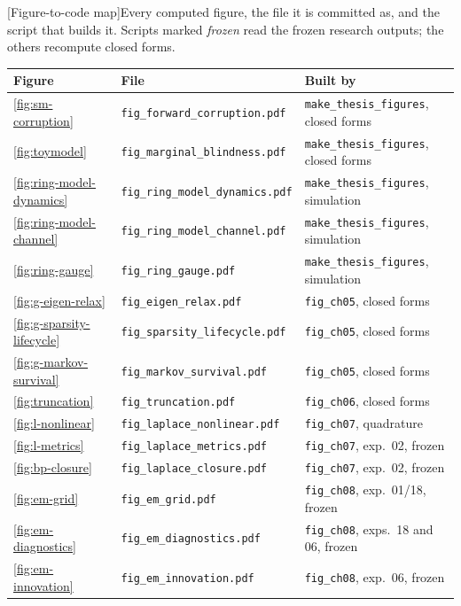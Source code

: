 \begin{center}
\begin{minipage}{\linewidth}\small\centering
{}[Figure-to-code map]{Every computed figure, the file it is
committed as, and the script that builds it. Scripts marked \emph{frozen}
read the frozen research outputs; the others recompute closed forms.}
\label{tab:figure-map}
\begin{tabular}{@{}lll@{}}
\toprule
Figure & File & Built by \\
\midrule
\ref{fig:sm-corruption} & \texttt{fig\_forward\_corruption.pdf} & \texttt{make\_thesis\_figures}, closed forms \\
\ref{fig:toymodel} & \texttt{fig\_marginal\_blindness.pdf} & \texttt{make\_thesis\_figures}, closed forms \\
\ref{fig:ring-model-dynamics} & \texttt{fig\_ring\_model\_dynamics.pdf} & \texttt{make\_thesis\_figures}, simulation \\
\ref{fig:ring-model-channel} & \texttt{fig\_ring\_model\_channel.pdf} & \texttt{make\_thesis\_figures}, simulation \\
\ref{fig:ring-gauge} & \texttt{fig\_ring\_gauge.pdf} & \texttt{make\_thesis\_figures}, simulation \\
\ref{fig:g-eigen-relax} & \texttt{fig\_eigen\_relax.pdf} & \texttt{fig\_ch05}, closed forms \\
\ref{fig:g-sparsity-lifecycle} & \texttt{fig\_sparsity\_lifecycle.pdf} & \texttt{fig\_ch05}, closed forms \\
\ref{fig:g-markov-survival} & \texttt{fig\_markov\_survival.pdf} & \texttt{fig\_ch05}, closed forms \\
\ref{fig:truncation} & \texttt{fig\_truncation.pdf} & \texttt{fig\_ch06}, closed forms \\
\ref{fig:l-nonlinear} & \texttt{fig\_laplace\_nonlinear.pdf} & \texttt{fig\_ch07}, quadrature \\
\ref{fig:l-metrics} & \texttt{fig\_laplace\_metrics.pdf} & \texttt{fig\_ch07}, exp.~02, frozen \\
\ref{fig:bp-closure} & \texttt{fig\_laplace\_closure.pdf} & \texttt{fig\_ch07}, exp.~02, frozen \\
\ref{fig:em-grid} & \texttt{fig\_em\_grid.pdf} & \texttt{fig\_ch08}, exp.~01/18, frozen \\
\ref{fig:em-diagnostics} & \texttt{fig\_em\_diagnostics.pdf} & \texttt{fig\_ch08}, exps.~18 and 06, frozen \\
\ref{fig:em-innovation} & \texttt{fig\_em\_innovation.pdf} & \texttt{fig\_ch08}, exp.~06, frozen \\

\end{tabular}
\end{minipage}
\end{center}
